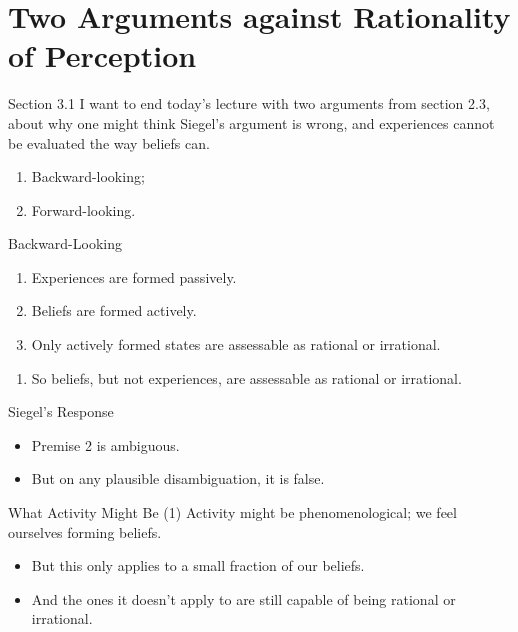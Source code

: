 \documentclass[
  17pt,
  letterpaper,
  ignorenonframetext,
  aspectratio=169,
  xcolor={dvipsnames}]{beamer}
\providecommand{\tightlist}{%
  \setlength{\itemsep}{0pt}\setlength{\parskip}{0pt}}\usepackage{longtable,booktabs,array}
\begin{document}
\hypertarget{two-arguments-against-rationality-of-perception}{%
\section{Two Arguments against Rationality of
Perception}\label{two-arguments-against-rationality-of-perception}}

\begin{frame}{Section 3.1}
\protect\hypertarget{section-3.1}{}
I want to end today's lecture with two arguments from section 2.3, about
why one might think Siegel's argument is wrong, and experiences cannot
be evaluated the way beliefs can.

\begin{enumerate}[<+->]
\tightlist
\item
  Backward-looking;
\item
  Forward-looking.
\end{enumerate}
\end{frame}

\begin{frame}{Backward-Looking}
\protect\hypertarget{backward-looking}{}
\begin{enumerate}[<+->]
\tightlist
\item
  Experiences are formed passively.
\item
  Beliefs are formed actively.
\item
  Only actively formed states are assessable as rational or irrational.
\end{enumerate}

\begin{enumerate}[<+->]
[A.]
\setcounter{enumi}{2}
\tightlist
\item
  So beliefs, but not experiences, are assessable as rational or
  irrational.
\end{enumerate}
\end{frame}

\begin{frame}{Siegel's Response}
\protect\hypertarget{siegels-response}{}
\begin{itemize}[<+->]
\tightlist
\item
  Premise 2 is ambiguous.
\item
  But on any plausible disambiguation, it is false.
\end{itemize}
\end{frame}

\begin{frame}{What Activity Might Be (1)}
\protect\hypertarget{what-activity-might-be-1}{}
Activity might be phenomenological; we feel ourselves forming beliefs.

\begin{itemize}[<+->]
\tightlist
\item
  But this only applies to a small fraction of our beliefs.
\item
  And the ones it doesn't apply to are still capable of being rational
  or irrational.
\end{itemize}
\end{frame}
\end{document}
